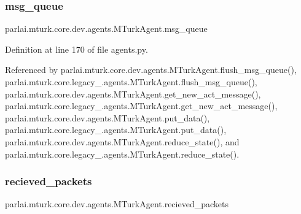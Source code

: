 \mbox{\label{classparlai_1_1mturk_1_1core_1_1dev_1_1agents_1_1MTurkAgent_a3bcf53409f598de0b9842df12f5b70f9}} 
\subsubsection{\texorpdfstring{msg\+\_\+queue}{msg\_queue}}
{\footnotesize\ttfamily parlai.\+mturk.\+core.\+dev.\+agents.\+M\+Turk\+Agent.\+msg\+\_\+queue}



Definition at line 170 of file agents.\+py.



Referenced by parlai.\+mturk.\+core.\+dev.\+agents.\+M\+Turk\+Agent.\+flush\+\_\+msg\+\_\+queue(), parlai.\+mturk.\+core.\+legacy\+\_.\+agents.\+M\+Turk\+Agent.\+flush\+\_\+msg\+\_\+queue(), parlai.\+mturk.\+core.\+dev.\+agents.\+M\+Turk\+Agent.\+get\+\_\+new\+\_\+act\+\_\+message(), parlai.\+mturk.\+core.\+legacy\+\_.\+agents.\+M\+Turk\+Agent.\+get\+\_\+new\+\_\+act\+\_\+message(), parlai.\+mturk.\+core.\+dev.\+agents.\+M\+Turk\+Agent.\+put\+\_\+data(), parlai.\+mturk.\+core.\+legacy\+\_.\+agents.\+M\+Turk\+Agent.\+put\+\_\+data(), parlai.\+mturk.\+core.\+dev.\+agents.\+M\+Turk\+Agent.\+reduce\+\_\+state(), and parlai.\+mturk.\+core.\+legacy\+\_.\+agents.\+M\+Turk\+Agent.\+reduce\+\_\+state().

\mbox{\label{classparlai_1_1mturk_1_1core_1_1dev_1_1agents_1_1MTurkAgent_a92f02000f55dc982d47299b41f630f18}} 
\subsubsection{\texorpdfstring{recieved\+\_\+packets}{recieved\_packets}}
{\footnotesize\ttfamily parlai.\+mturk.\+core.\+dev.\+agents.\+M\+Turk\+Agent.\+recieved\+\_\+packets}




